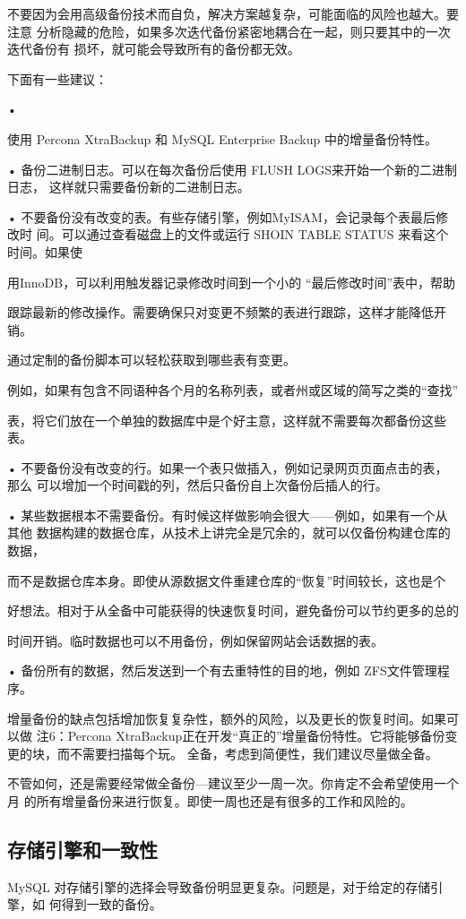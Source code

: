 不要因为会用高级备份技术而自负，解决方案越复杂，可能面临的风险也越大。要注意
分析隐藏的危险，如果多次迭代备份紧密地耦合在一起，则只要其中的一次迭代备份有
损坏，就可能会导致所有的备份都无效。

下面有一些建议：

•

使用 Percona XtraBackup 和 MySQL Enterprise Backup 中的增量备份特性。

• 备份二进制日志。可以在每次备份后使用 FLUSH LOGS来开始一个新的二进制日志，
这样就只需要备份新的二进制日志。

• 不要备份没有改变的表。有些存储引擎，例如MyISAM，会记录每个表最后修改时
间。可以通过查看磁盘上的文件或运行 SHOIN TABLE STATUS 来看这个时间。如果使

用InnoDB，可以利用触发器记录修改时间到一个小的 “最后修改时间”表中，帮助

跟踪最新的修改操作。需要确保只对变更不频繁的表进行跟踪，这样才能降低开销。

通过定制的备份脚本可以轻松获取到哪些表有变更。

例如，如果有包含不同语种各个月的名称列表，或者州或区域的简写之类的“查找”

表，将它们放在一个单独的数据库中是个好主意，这样就不需要每次都备份这些表。

• 不要备份没有改变的行。如果一个表只做插入，例如记录网页页面点击的表，那么
可以增加一个时间戳的列，然后只备份自上次备份后插人的行。

• 某些数据根本不需要备份。有时候这样做影响会很大——例如，如果有一个从其他
数据构建的数据仓库，从技术上讲完全是冗余的，就可以仅备份构建仓库的数据，

而不是数据仓库本身。即使从源数据文件重建仓库的“恢复”时间较长，这也是个

好想法。相对于从全备中可能获得的快速恢复时间，避免备份可以节约更多的总的

时间开销。临时数据也可以不用备份，例如保留网站会话数据的表。

• 备份所有的数据，然后发送到一个有去重特性的目的地，例如 ZFS文件管理程序。

增量备份的缺点包括增加恢复复杂性，额外的风险，以及更长的恢复时间。如果可以做
注6：Percona XtraBackup正在开发“真正的”增量备份特性。它将能够备份变更的块，而不需要扫描每个玩。
全备，考虑到简便性，我们建议尽量做全备。

不管如何，还是需要经常做全备份—建议至少一周一次。你肯定不会希望使用一个月
的所有增量备份来进行恢复。即使一周也还是有很多的工作和风险的。

\subsection{存储引擎和一致性}
MySQL 对存储引擎的选择会导致备份明显更复杂。问题是，对于给定的存储引擎，如
何得到一致的备份。

